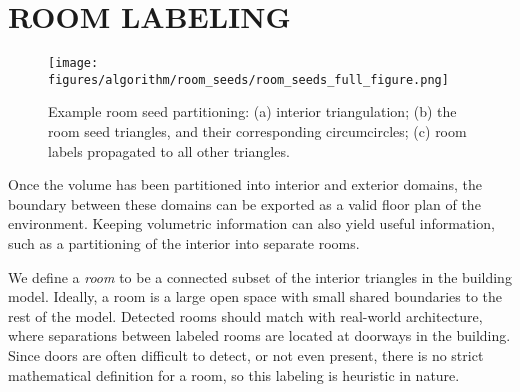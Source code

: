 \documentclass[a4paper,twoside]{article}
\begin{document}

\section{\uppercase{Room Labeling}}
\label{sec:roomlabeling}

\begin{figure*}[t]
  \centering
  \texttt{[image: figures/algorithm/room\_seeds/room\_seeds\_full\_figure.png]}
  \caption{Example room seed partitioning: (a) interior triangulation; (b) the room seed triangles, and their corresponding circumcircles; (c) room labels propagated to all other triangles.}
  \label{fig:roomlabeling}
\end{figure*}

\noindent Once the volume has been partitioned into interior and exterior domains, the boundary between these domains can be exported as a valid floor plan of the environment.  Keeping volumetric information can also yield useful information, such as a partitioning of the interior into separate rooms.

We define a {\it room} to be a connected subset of the interior triangles in the building model.  Ideally, a room is a large open space with small shared boundaries to the rest of the model.  Detected rooms should match with real-world architecture, where separations between labeled rooms are located at doorways in the building.  Since doors are often difficult to detect, or not even present, there is no strict mathematical definition for a room, so this labeling is heuristic in nature.
\end{document}
